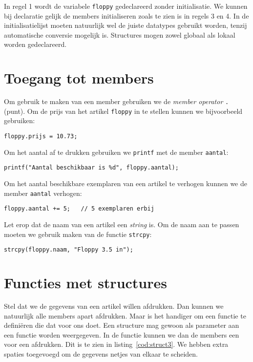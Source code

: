 
In regel 1 wordt de variabele \texttt{floppy} gedeclareerd zonder initialisatie. We kunnen bij declaratie gelijk de members initialiseren zoals te zien is in regels 3 en 4. In de initialisatielijst moeten natuurlijk wel de juiste datatypes gebruikt worden, tenzij automatische conversie mogelijk is. Structures mogen zowel globaal als lokaal worden gedeclareerd.

\section{Toegang tot members}
Om gebruik te maken van een member gebruiken we de \textsl{member operator} \texttt{.} (punt). Om de prijs van het artikel \texttt{floppy} in te stellen kunnen we bijvoorbeeld gebruiken:

\hspace*{1em}\texttt{floppy.prijs = 10.73;}

Om het aantal af te drukken gebruiken we \texttt{printf} met de member \texttt{aantal}:

\hspace*{1em}\texttt{printf("Aantal beschikbaar is \%d", floppy.aantal);}

Om het aantal beschikbare exemplaren van een artikel te verhogen kunnen we de member \texttt{aantal} verhogen:

\hspace*{1em}\texttt{floppy.aantal += 5; \ \ // 5 exemplaren erbij}

Let erop dat de naam van een artikel een \textsl{string} is. Om de naam aan te passen moeten we gebruik maken van de functie \texttt{strcpy}:

\hspace*{1em}\texttt{strcpy(floppy.naam, "Floppy 3.5 in");}

\section{Functies met structures}
Stel dat we de gegevens van een artikel willen afdrukken. Dan kunnen we natuurlijk alle members apart afdrukken. Maar is het handiger om een functie te definiëren die dat voor ons doet. Een structure mag gewoon als parameter aan een functie worden weergegeven. In de functie kunnen we dan de members een voor een afdrukken. Dit is te zien in listing~\ref{cod:struct3}. We hebben extra spaties toegevoegd om de gegevens netjes van elkaar te scheiden.

